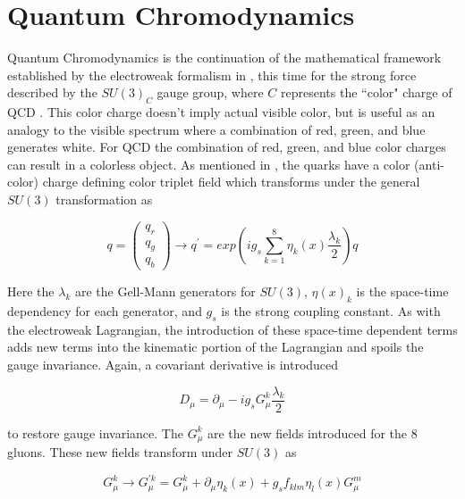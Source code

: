\section{Quantum Chromodynamics} \label{sec:theory:qcd}

Quantum Chromodynamics is the continuation of the mathematical framework
established by the electroweak formalism in , this time
for the strong force described by the $SU(3)_C$ gauge group, where $C$
represents the ``color" charge of QCD \cite{Campbell:2017hsr}.  This
color charge doesn't imply actual visible color, but is useful as an analogy to
the visible spectrum where a combination of red, green, and blue generates
white.  For QCD the combination of red, green, and blue color charges can
result in a colorless object.  As mentioned in , the
quarks have a color (anti-color) charge defining color triplet field which
transforms under the general $SU(3)$ transformation as

\begin{equation}
q = \left( \begin{matrix} q_{r} \\ q_{g} \\ q_{b} \end{matrix} \right)
\rightarrow q^{'} = exp \left( ig_{s} \sum_{k=1}^{8} \eta_{k}(x)
\frac{\lambda_k}{2} \right) q
\end{equation}

Here the $\lambda_{k}$ are the Gell-Mann generators for $SU(3)$, $\eta(x)_{k}$ is the
space-time dependency for each generator, and  $g_s$ is the strong coupling constant.
As with the electroweak Lagrangian, the introduction of these space-time dependent terms adds new
terms into the kinematic portion of the Lagrangian and spoils the gauge 
invariance.  Again, a covariant derivative is introduced 

\begin{equation}
D_{\mu} = \partial_{\mu} - ig_{s}G_{\mu}^{k}\frac{\lambda_{k}}{2}
\end{equation}

to restore gauge invariance. The $G_{\mu}^{k}$ are the new fields introduced
for the 8 gluons.  These new fields transform under $SU(3)$ as

\begin{equation} \label{eq:qcd:gluon_field}
G_{\mu}^{k} \rightarrow G_{\mu}^{'k} = G_{\mu}^{k} + \partial_{\mu}\eta_{k}(x) +
g_{s}f_{klm}\eta_{l}(x)G_{\mu}^{m}
\end{equation}

